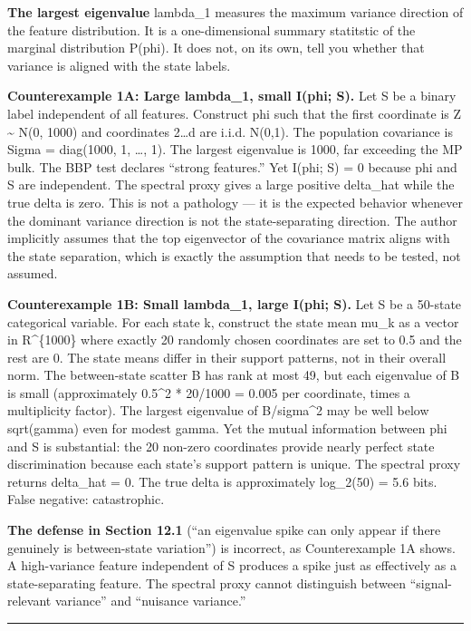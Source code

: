 \documentclass[
  12pt,
]{article}
\begin{document}
\textbf{The largest eigenvalue} lambda\_1 measures the maximum variance
direction of the feature distribution. It is a one-dimensional summary
statitstic of the marginal distribution P(phi). It does not, on its own,
tell you whether that variance is aligned with the state labels.

\textbf{Counterexample 1A: Large lambda\_1, small I(phi; S).} Let S be a
binary label independent of all features. Construct phi such that the
first coordinate is Z \textasciitilde{} N(0, 1000) and coordinates
2\ldots d are i.i.d. N(0,1). The population covariance is Sigma =
diag(1000, 1, \ldots, 1). The largest eigenvalue is 1000, far exceeding
the MP bulk. The BBP test declares ``strong features.'' Yet I(phi; S) =
0 because phi and S are independent. The spectral proxy gives a large
positive delta\_hat while the true delta is zero. This is not a
pathology --- it is the expected behavior whenever the dominant variance
direction is not the state-separating direction. The author implicitly
assumes that the top eigenvector of the covariance matrix aligns with
the state separation, which is exactly the assumption that needs to be
tested, not assumed.

\textbf{Counterexample 1B: Small lambda\_1, large I(phi; S).} Let S be a
50-state categorical variable. For each state k, construct the state
mean mu\_k as a vector in R\^{}\{1000\} where exactly 20 randomly chosen
coordinates are set to 0.5 and the rest are 0. The state means differ in
their support patterns, not in their overall norm. The between-state
scatter B has rank at most 49, but each eigenvalue of B is small
(approximately 0.5\^{}2 * 20/1000 = 0.005 per coordinate, times a
multiplicity factor). The largest eigenvalue of B/sigma\^{}2 may be well
below sqrt(gamma) even for modest gamma. Yet the mutual information
between phi and S is substantial: the 20 non-zero coordinates provide
nearly perfect state discrimination because each state's support pattern
is unique. The spectral proxy returns delta\_hat = 0. The true delta is
approximately log\_2(50) = 5.6 bits. False negative: catastrophic.

\textbf{The defense in Section 12.1} (``an eigenvalue spike can only
appear if there genuinely is between-state variation'') is incorrect, as
Counterexample 1A shows. A high-variance feature independent of S
produces a spike just as effectively as a state-separating feature. The
spectral proxy cannot distinguish between ``signal-relevant variance''
and ``nuisance variance.''

\begin{center}\rule{0.5\linewidth}{0.5pt}\end{center}
\end{document}
